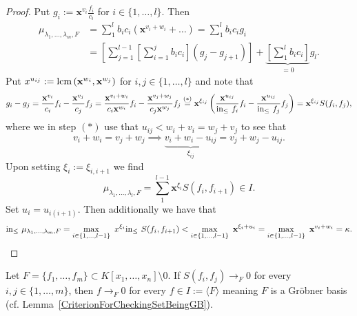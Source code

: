 \begin{proof}
    Put $g_i := \mathbf{x}^{v_i}\frac{f_i}{c_i}$ for $i\in \{1,\dots,l\}$. Then 
    \begin{align*}
        \mu_{\lambda_1,\dots,\lambda_m,F} &= \sum_1^l b_ic_i\left(\mathbf{x}^{v_i+w_i}+\dots\right) = \sum_1^l b_ic_ig_i\\ 
        &= \left[\sum_{j=1}^{l-1}\left[ \sum_{i = 1}^j b_ic_i \right](g_j-g_{j+1})\right] + \underbrace{\left[\sum_1^l b_ic_i\right]}_{=0} g_l. 
    \end{align*}
    Put $x^{u_{ij}} := \mathrm{lcm}\left(\mathbf{x}^{w_i},\mathbf{x}^{w_j} \right)$ for $i,j\in\{1,\dots,l\}$ and note that 
    $$g_i-g_j = \frac{\mathbf{x}^{v_i}}{c_i}f_i-\frac{\mathbf{x}^{v_j}}{c_j}f_j = \frac{\mathbf{x}^{v_i+w_i}}{c_i\mathbf{x}^{w_i}}f_i-\frac{\mathbf{x}^{v_j+w_j}}{c_j\mathbf{x}^{w_j}}f_j \overset{(\ast)}{=} \mathbf{x}^{\xi_{ij}}\left( \frac{\mathbf{x}^{u_{ij}}}{\inn\ f_i}f_i-\frac{\mathbf{x}^{u_{ij}}}{\inn\ f_j}f_j\right) = \mathbf{x}^{\xi_{ij}}S(f_i,f_j),$$
    where we in step $(\ast)$ use that $u_{ij} < w_i+v_i=w_j+v_j$  to see that 
    $$v_i+w_i = v_j+w_j \implies \underbrace{v_i+w_i-u_{ij}}_{\xi_{ij}} = v_j+w_j-u_{ij}.$$
    Upon setting $\xi_{i}:=\xi_{i,i+1}$ we find
    $$\mu_{\lambda_1,\dots,\lambda_l,F} = \sum_1^{l-1} \mathbf{x}^{\xi_i}S(f_i,f_{i+1})\in I.$$
    Set $u_i = u_{i(i+1)}$. Then additionally we have that 
    $$\inn \ \mu_{\lambda_1,\dots,\lambda_m,F} = \max_{i\in\{1,\dots,l-1\}}\ x^{\xi_i}\inn\ S(f_i,f_{i+1}) < \max_{i\in\{1,\dots,l-1\}}\ \mathbf{x}^{\xi_i+u_i} = \max_{i\in\{1,\dots,l-1\}}\ \mathbf{x}^{v_i+w_i} = \kappa.$$
\end{proof}
\begin{theorem}\label{BuchBergersCritbeta}
    Let $F= \{ f_1,\dots,f_m\}\subset K[x_1,\dots,x_n]\setminus 0$. If $S(f_i,f_j)\to_F 0$ for every $i,j\in\{1,\dots,m\}$, then $f\to_F 0$ for every $f\in I:=\langle F\rangle$ meaning $F$ is a Gröbner basis (cf. Lemma~\ref{CriterionForCheckingSetBeingGB}).
\end{theorem}
